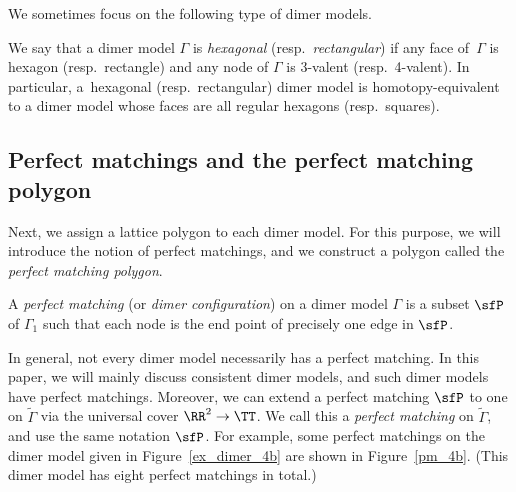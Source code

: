 We sometimes focus on the following type of dimer models.

\begin{Definition}\label{def_hexagonal_square}
We say that a dimer model $\Gamma$ is \emph{hexagonal} (resp.\ \emph{rectangular})
if any face of~$\Gamma$ is hexagon (resp.\ rectangle) and any node of $\Gamma$ is $3$-valent (resp.\ 4-valent).
In particular, a~hexagonal (resp.\ rectangular) dimer model is homotopy-equivalent to a dimer model whose faces are all regular hexagons (resp.\ squares).
\end{Definition}

\subsection{Perfect matchings and the perfect matching polygon}\label{subsection_PM}

Next, we assign a lattice polygon to each dimer model.
For this purpose, we will introduce the notion of perfect matchings, and we construct a polygon called the \emph{perfect matching polygon}.

\begin{Definition}A \emph{perfect matching} (or \emph{dimer configuration}) on a dimer model $\Gamma$ is a subset $\sfP$ of $\Gamma_1$ such that each node is
the end point of precisely one edge in $\sfP$.
\end{Definition}

In general, not every dimer model necessarily has a perfect matching.
In this paper, we will mainly discuss consistent dimer models, and such dimer models have perfect matchings.
Moreover, we can extend a perfect matching $\sfP$ to one on $\widetilde{\Gamma}$ via the universal cover $\RR^2\rightarrow\TT$.
We call this a \emph{perfect matching} on $\widetilde{\Gamma}$, and use the same notation $\sfP$.
For example, some perfect matchings on the dimer model given in Figure~\ref{ex_dimer_4b} are shown in Figure~\ref{pm_4b}.
(This dimer model has eight perfect matchings in total.)

